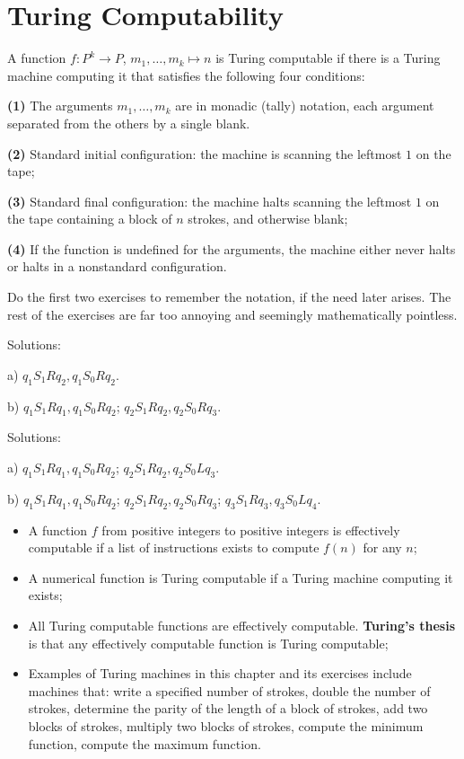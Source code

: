 \section{Turing Computability} %
\label{sec:turing_computability}
A function $f\colon P^k \to P$, $m_1,\ldots,m_k \mapsto n$ is Turing computable if there is a Turing machine computing it that satisfies the following four conditions:

\textbf{(1) }The arguments $m_1,\ldots,m_k$ are in monadic (tally) notation, each argument separated from the others by a single blank.

\textbf{(2) }Standard initial configuration: the machine is scanning the leftmost $1$ on the tape;

\textbf{(3) }Standard final configuration: the machine halts scanning the leftmost $1$ on the tape containing a block of $n$ strokes, and otherwise blank;

\textbf{(4) }If the function is undefined for the arguments, the machine either never halts or halts in a nonstandard configuration.

Do the first two exercises to remember the notation, if the need later arises.
The rest of the exercises are far too annoying and seemingly mathematically pointless.

\begin{exercise}[3.1]
  Solutions:

  a) $q_1S_1Rq_2, q_1S_0Rq_2$.

  b) $q_1S_1Rq_1, q_1S_0Rq_2$; $q_2S_1Rq_2, q_2S_0Rq_3$.
\end{exercise}

\begin{exercise}[3.2]
  Solutions:

  a) $q_1S_1Rq_1, q_1S_0Rq_2$; $q_2S_1Rq_2, q_2S_0Lq_3$.

  b) $q_1S_1Rq_1, q_1S_0Rq_2$; $q_2S_1Rq_2, q_2S_0Rq_3$; $q_3S_1Rq_3, q_3S_0Lq_4$.
\end{exercise}

\begin{summary}
  \begin{itemize}
    \item A function $f$ from positive integers to positive integers is effectively computable if a list of instructions exists to compute $f(n)$ for any $n$;
    \item A numerical function is Turing computable if a Turing machine computing it exists;
    \item All Turing computable functions are effectively computable.
    \textbf{Turing's thesis} is that any effectively computable function is Turing computable;
    \item Examples of Turing machines in this chapter and its exercises include machines that: write a specified number of strokes, double the number of strokes, determine the parity of the length of a block of strokes, add two blocks of strokes, multiply two blocks of strokes, compute the minimum function, compute the maximum function.
  \end{itemize}
\end{summary}
